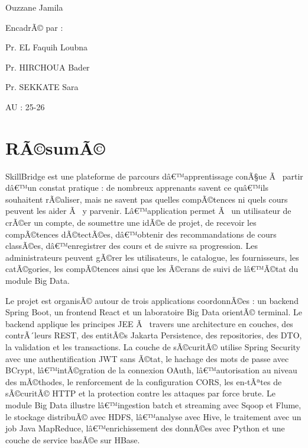 ﻿\documentclass[12pt,a4paper]{report}
\newcommand{\projectName}{SkillBridge}
\begin{document}
\begin{titlepage}
\begin{minipage}[t]{0.42\textwidth}
        {\small Ouzzane Jamila }
    \end{minipage}
    \hfill
    \begin{minipage}[t]{0.32\textwidth}
        {\small EncadrÃ© par :}

        \vspace{0.35cm}

        {\small Pr. EL Faquih Loubna}

        \vspace{0.25cm}

        {\small Pr. HIRCHOUA Bader}

        \vspace{0.25cm}

        {\small Pr. SEKKATE Sara}
    \end{minipage}

    \vfill

    \begin{center}
        {\small AU : 25-26}
    \end{center}

\end{titlepage}

\chapter*{RÃ©sumÃ©}
\projectName{} est une plateforme de parcours dâ€™apprentissage conÃ§ue Ã  partir dâ€™un constat pratique : de nombreux apprenants savent ce quâ€™ils souhaitent rÃ©aliser, mais ne savent pas quelles compÃ©tences ni quels cours peuvent les aider Ã  y parvenir. Lâ€™application permet Ã  un utilisateur de crÃ©er un compte, de soumettre une idÃ©e de projet, de recevoir les compÃ©tences dÃ©tectÃ©es, dâ€™obtenir des recommandations de cours classÃ©es, dâ€™enregistrer des cours et de suivre sa progression. Les administrateurs peuvent gÃ©rer les utilisateurs, le catalogue, les fournisseurs, les catÃ©gories, les compÃ©tences ainsi que les Ã©crans de suivi de lâ€™Ã©tat du module Big Data.

Le projet est organisÃ© autour de trois applications coordonnÃ©es : un backend Spring Boot, un frontend React et un laboratoire Big Data orientÃ© terminal. Le backend applique les principes JEE Ã  travers une architecture en couches, des contrÃ´leurs REST, des entitÃ©s Jakarta Persistence, des repositories, des DTO, la validation et les transactions. La couche de sÃ©curitÃ© utilise Spring Security avec une authentification JWT sans Ã©tat, le hachage des mots de passe avec BCrypt, lâ€™intÃ©gration de la connexion OAuth, lâ€™autorisation au niveau des mÃ©thodes, le renforcement de la configuration CORS, les en-tÃªtes de sÃ©curitÃ© HTTP et la protection contre les attaques par force brute. Le module Big Data illustre lâ€™ingestion batch et streaming avec Sqoop et Flume, le stockage distribuÃ© avec HDFS, lâ€™analyse avec Hive, le traitement avec un job Java MapReduce, lâ€™enrichissement des donnÃ©es avec Python et une couche de service basÃ©e sur HBase.
\end{document}
